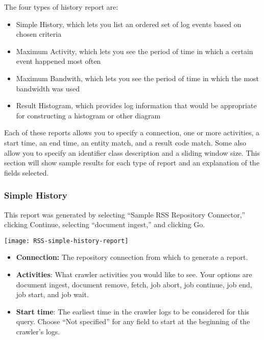 \begin{changemargin}{1.5in}{0in}
The four types of history report are:

\begin{itemize}

\item Simple History, which lets you list an ordered set of log events
based on chosen criteria

\item Maximum Activity, which lets you see the period of time in
which a certain event happened most often

\item Maximum Bandwith, which lets you see the period of time in
which the most bandwidth was used 

\item Result Histogram, which provides log information that would be
appropriate for constructing a histogram or other diagram

\end{itemize}

Each of these reports allows you to specify a connection, one or more
activities, a start time, an end time, an entity match, and a result code
match.  Some also allow you to specify an identifier class description
and a sliding window size. This section will show sample results for
each type of report and an explanation of the fields selected.

\subsubsection{Simple History}

This report was generated by selecting ``Sample RSS Repository Connector,'' 
clicking Continue, selecting ``document ingest,'' and clicking Go.

\texttt{[image: RSS-simple-history-report]}

\begin{itemize}

\item \textbf{Connection:} The repository connection from which to generate
a report.

\item \textbf{Activities}: What crawler activities you would like to
see.  Your options are document ingest, document remove, fetch, job
abort, job continue, job end, job start, and job wait.

\item \textbf{Start time}: The earliest time in the crawler logs to be
considered for this query.  Choose ``Not specified'' for any field to
start at the beginning of the crawler's logs.


\end{itemize}
\end{changemargin}
